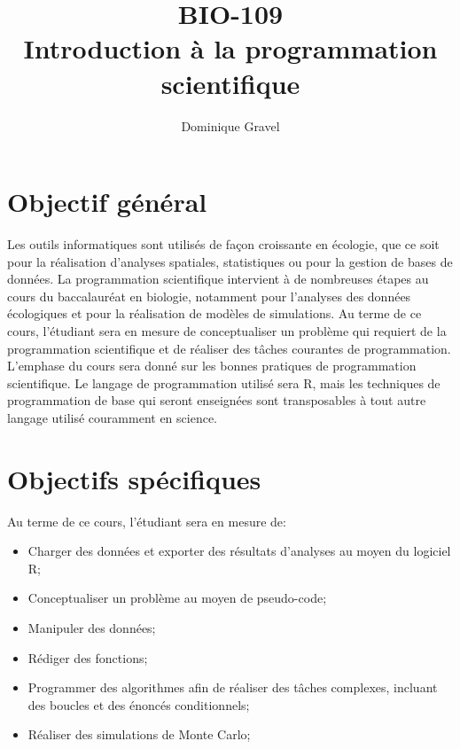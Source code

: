 \documentclass[12]{article}
\title{BIO-109 \\ Introduction à la programmation scientifique}
\date {\printdate{2018-1-8}}
\author {Dominique Gravel}
\affil {Département de biologie \\
Université de Sherbrooke \\
Local D8-3066 \\
819-821-8000 \#66589}
\affil {\url{dominique.gravel@usherbrooke.ca}}
\begin{document}
	\maketitle

	\section*{Objectif général}

	Les outils informatiques sont utilisés de façon croissante en écologie,
	que ce soit pour la réalisation d'analyses spatiales, statistiques ou pour
	la gestion de bases de données. La programmation scientifique intervient à
	de nombreuses étapes au cours du baccalauréat en biologie, notamment pour
	l'analyses des données écologiques et pour la réalisation de modèles
	de simulations. Au terme de ce cours, l'étudiant sera en mesure de
	conceptualiser un problème qui requiert de la programmation scientifique
	et de réaliser des tâches courantes de programmation. L'emphase du cours
	sera donné sur les bonnes pratiques de programmation scientifique. Le
	langage de programmation utilisé sera R, mais les techniques de
	programmation de base qui seront enseignées sont transposables à tout
	autre langage utilisé couramment en science.

	\section*{Objectifs spécifiques}

	Au terme de ce cours, l'étudiant sera en mesure de:

	\begin{itemize}
	\renewcommand{\labelitemi}{$\bullet$}

	\item Charger des données et exporter des résultats d'analyses au moyen du
	logiciel R;

	\item Conceptualiser un problème au moyen de pseudo-code;

	\item Manipuler des données;

	\item Rédiger des fonctions;

    \item Programmer des algorithmes afin de réaliser des tâches complexes,
	incluant des boucles et des énoncés conditionnels;

	\item Réaliser des simulations de Monte Carlo;

	\end{itemize}
\end{document}
